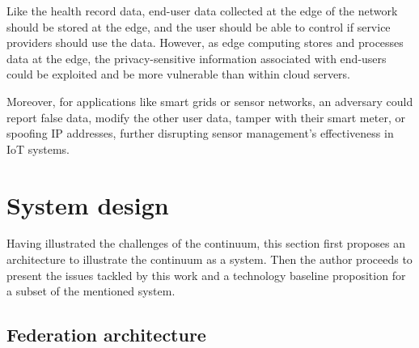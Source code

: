 Like the health record data, end-user data collected at the edge of the network should be stored at the edge, and the user should be able to control if service providers should use the data. However, as edge computing stores and processes data at the edge, the privacy-sensitive information associated with end-users could be exploited and be more vulnerable than within cloud servers.

Moreover, for applications like smart grids or sensor networks, an adversary could report false data, modify the other user data, tamper with their smart meter, or spoofing IP addresses, further disrupting sensor management's effectiveness in IoT systems.



\section{System design}
\label{sec:technicals}

Having illustrated the challenges of the continuum, this section first proposes an architecture to illustrate the continuum as a system. Then the author proceeds to present the issues tackled by this work and a technology baseline proposition for a subset of the mentioned system. 

\subsection{Federation architecture}

